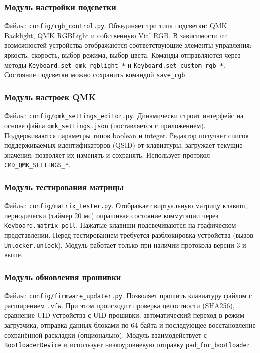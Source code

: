 \subsubsection{Модуль настройки подсветки}
Файлы: \texttt{config/rgb\_control.py}.
Объединяет три типа подсветки: QMK Backlight, QMK RGBLight и собственную Vial RGB. В зависимости от возможностей устройства отображаются соответствующие элементы управления: яркость, скорость, выбор режима, выбор цвета. Команды отправляются через методы \texttt{Keyboard.set\_qmk\_rgblight\_*} и \texttt{Keyboard.set\_custom\_rgb\_*}. Состояние подсветки можно сохранить командой \texttt{save\_rgb}.

\subsubsection{Модуль настроек QMK}
Файлы: \texttt{config/qmk\_settings\_editor.py}.
Динамически строит интерфейс на основе файла \texttt{qmk\_settings.json} (поставляется с приложением). Поддерживаются параметры типов boolean и integer. Редактор получает список поддерживаемых идентификаторов (QSID) от клавиатуры, загружает текущие значения, позволяет их изменять и сохранять. Использует протокол \texttt{CMD\_QMK\_SETTINGS\_*}.

\subsubsection{Модуль тестирования матрицы}
Файлы: \texttt{config/matrix\_tester.py}.
Отображает виртуальную матрицу клавиш, периодически (таймер 20 мс) опрашивая состояние коммутации через \texttt{Keyboard.matrix\_poll}. Нажатые клавиши подсвечиваются на графическом представлении. Перед тестированием требуется разблокировка устройства (вызов \texttt{Unlocker.unlock}). Модуль работает только при наличии протокола версии 3 и выше.

\subsubsection{Модуль обновления прошивки}
Файлы: \texttt{config/firmware\_updater.py}.
Позволяет прошить клавиатуру файлом с расширением \texttt{.vfw}. При этом происходит проверка целостности (SHA256), сравнение UID устройства с UID прошивки, автоматический переход в режим загрузчика, отправка данных блоками по 64 байта и последующее восстановление сохранённой раскладки (опционально). Модуль взаимодействует с \texttt{BootloaderDevice} и использует низкоуровневую отправку \texttt{pad\_for\_bootloader}.


